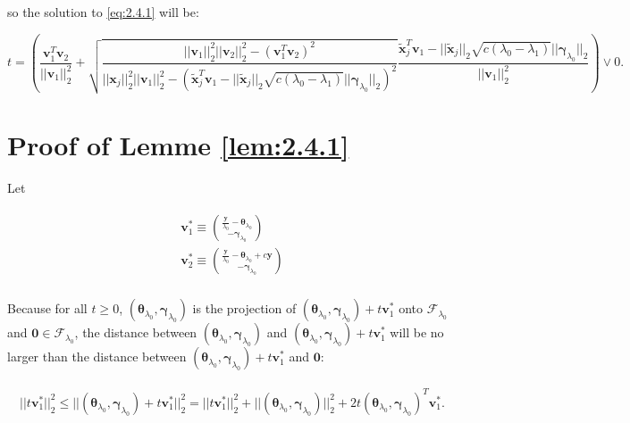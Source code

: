 so the solution to \eqref{eq:2.4.1} will be:

\begin{equation}
    t=\left(\frac{\boldsymbol v_1^T\boldsymbol v_2}{||\boldsymbol v_1||_2^2}+\sqrt{\frac{||\boldsymbol v_1||_2^2||\boldsymbol v_2||_2^2-(\boldsymbol v_1^T\boldsymbol v_2)^2}{||\boldsymbol x_j||_2^2||\boldsymbol v_1||_2^2-\left(\tilde{\boldsymbol x}_j^T\boldsymbol v_1-||\tilde{\boldsymbol x}_j||_2\sqrt{c(\lambda_0-\lambda_1)}||\boldsymbol\gamma_{\lambda_0}||_2\right)^2}}\frac{\tilde{\boldsymbol x}_j^T\boldsymbol v_1-||\tilde{\boldsymbol x}_j||_2\sqrt{c(\lambda_0-\lambda_1)}||\boldsymbol\gamma_{\lambda_0}||_2}{||\boldsymbol v_1||_2^2}\right)\vee 0.
\end{equation}

\section{Proof of Lemme \ref{lem:2.4.1}}

Let

\begin{gather}
    \begin{aligned}
        \boldsymbol v_1^*\equiv\binom{\frac{\boldsymbol y}{\lambda_0}-\boldsymbol\theta_{\lambda_0}}{-\boldsymbol\gamma_{\lambda_0}}\\
        \boldsymbol v_2^*\equiv\binom{\frac{\boldsymbol y}{\lambda_0}-\boldsymbol\theta_{\lambda_0}+c\boldsymbol y}{-\boldsymbol\gamma_{\lambda_0}}\\
    \end{aligned}
\end{gather}

Because for all $t\geq 0$, $(\boldsymbol\theta_{\lambda_0},\boldsymbol\gamma_{\lambda_0})$ is the projection of $(\boldsymbol\theta_{\lambda_0},\boldsymbol\gamma_{\lambda_0})+t\boldsymbol v_1^*$ onto $\mathcal{F}_{\lambda_0}$ and $\boldsymbol 0\in \mathcal{F}_{\lambda_0}$, the distance between $(\boldsymbol\theta_{\lambda_0},\boldsymbol\gamma_{\lambda_0})$ and $(\boldsymbol\theta_{\lambda_0},\boldsymbol\gamma_{\lambda_0})+t\boldsymbol v_1^*$ will be no larger than the distance between $(\boldsymbol\theta_{\lambda_0},\boldsymbol\gamma_{\lambda_0})+t\boldsymbol v_1^*$ and $\boldsymbol 0$:

\begin{gather}
    \begin{aligned}
        ||t\boldsymbol v_1^*||_2^2\leq ||(\boldsymbol\theta_{\lambda_0},\boldsymbol\gamma_{\lambda_0})+t\boldsymbol v_1^*||_2^2=||t\boldsymbol v_1^*||_2^2+||(\boldsymbol\theta_{\lambda_0},\boldsymbol\gamma_{\lambda_0})||_2^2+2t(\boldsymbol\theta_{\lambda_0},\boldsymbol\gamma_{\lambda_0})^T\boldsymbol v_1^*.
    \end{aligned}
\end{gather}

